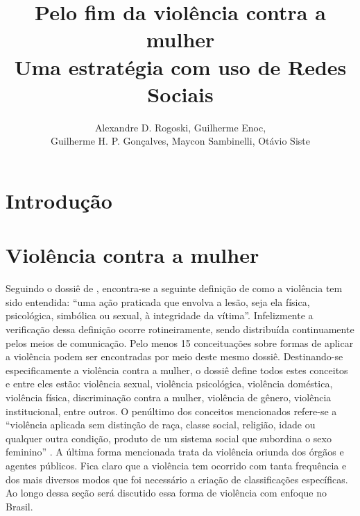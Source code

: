\documentclass[12pt]{article}
\title{Pelo fim da violência contra a mulher\\Uma estratégia com uso de Redes Sociais}
\author{Alexandre D. Rogoski, Guilherme Enoc,\\Guilherme H. P. Gonçalves, Maycon Sambinelli, Otávio Siste}
\begin{document}
\maketitle

\begin{abstract}
\end{abstract}

\begin{resumo}
\end{resumo}

\section{Introdução}


\section{Violência contra a mulher} %
Seguindo o dossiê de \cite{dossie}, encontra-se a seguinte definição de como
a violência tem sido entendida:
``uma ação praticada que envolva a lesão, seja ela física,
psicológica, simbólica ou sexual, à integridade da vítima''. Infelizmente
a verificação dessa definição ocorre rotineiramente, sendo distribuída
continuamente pelos meios de comunicação. Pelo menos 15 conceituações sobre
formas de aplicar a violência podem ser encontradas por meio deste mesmo
dossiê. Destinando-se especificamente a violência contra a mulher,
o dossiê define todos estes conceitos e entre eles estão: violência
sexual, violência psicológica, violência doméstica, violência física,
discriminação contra a mulher, violência de gênero, violência institucional,
entre outros. O penúltimo dos conceitos mencionados refere-se a ``violência
aplicada sem distinção de raça, classe social, religião, idade ou qualquer
outra condição, produto de um sistema social que subordina o sexo
feminino'' \cite{dossie}. A última forma mencionada trata da violência
oriunda dos órgãos e agentes públicos. Fica claro que a violência tem
ocorrido com tanta frequência e dos mais diversos modos que foi
necessário a criação de classificações específicas. Ao longo dessa
seção será discutido essa forma de violência com enfoque no Brasil.
\end{document}
